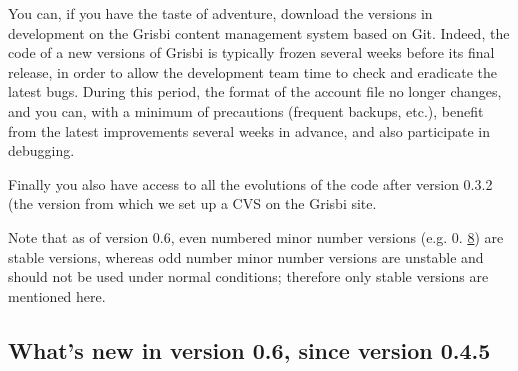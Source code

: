 You can, if you have the taste of adventure, download the versions in 
development on the Grisbi content management system based on \gls{Git}.
Indeed, the code of a new versions of Grisbi is typically frozen several weeks before its final release, in order to allow the development team time to check and eradicate the latest bugs. During this period, the format of the account file no longer changes, and you can, with a minimum of precautions (frequent backups, etc.), benefit from the latest improvements several weeks in advance, and also participate in debugging.

Finally you also have access to all the evolutions of the code after version 0.3.2 (the version from which we set up a \gls{CVS} on the Grisbi site.

Note that as of version 0.6, even numbered minor number versions (e.g. 0. \underline8) are stable versions, whereas odd number minor number versions are unstable and should not be used under normal conditions; therefore only stable versions are mentioned here.


\newpage

\subsection{What's new in version 0.6, since version 0.4.5}

